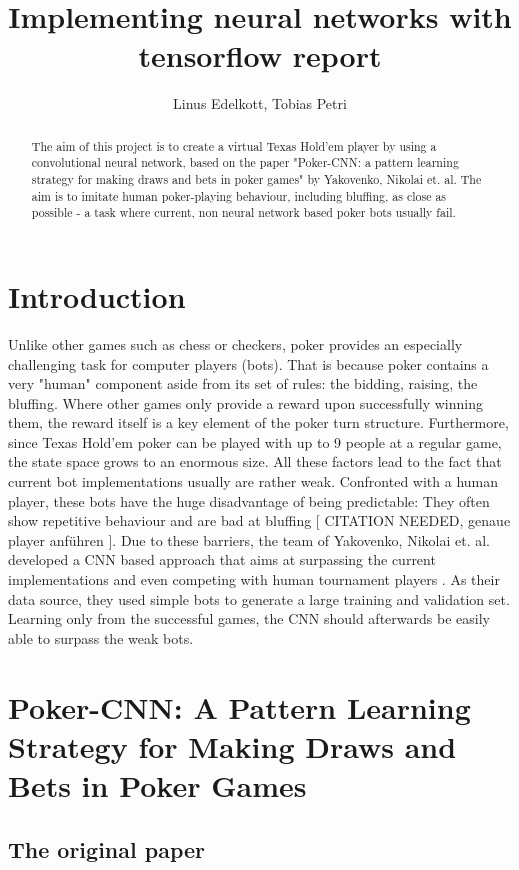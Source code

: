 \documentclass[]{report}
\title{Implementing neural networks with tensorflow report}
\author{Linus Edelkott, Tobias Petri}
\begin{document}
\maketitle

\begin{abstract}
The aim of this project is to create a virtual Texas Hold'em player by using a convolutional neural network, based on the paper "Poker-CNN: a pattern learning strategy for making draws and bets in poker games" \cite{1} by Yakovenko, Nikolai et. al.
The aim is to imitate human poker-playing behaviour, including bluffing, as close as possible - a task where current, non neural network based poker bots usually fail.
\end{abstract}


\section{Introduction}
Unlike other games such as chess or checkers, poker provides an especially challenging task for computer players (bots). That is because poker contains a very "human" component aside from its set of rules: the bidding, raising, the bluffing. Where other games only provide a reward upon successfully winning them, the reward itself is a key element of the poker turn structure. Furthermore, since Texas Hold'em poker can be played with up to 9 people at a regular game, the state space grows to an enormous size. All these factors lead to the fact that current bot implementations usually are rather weak. Confronted with a human player, these bots have the huge disadvantage of being predictable: They often show repetitive behaviour and are bad at bluffing [ CITATION NEEDED, genaue player anführen ]. Due to these barriers, the team of Yakovenko, Nikolai et. al. developed a CNN based approach that aims at surpassing the current implementations and even competing with human tournament players \cite{1}. As their data source, they used simple bots to generate a large training and validation set. Learning only from the successful games, the CNN should afterwards be easily able to surpass the weak bots.    

\section{Poker-CNN: A Pattern Learning Strategy for Making Draws and Bets in Poker Games}
\subsection{The original paper}
\end{document}
